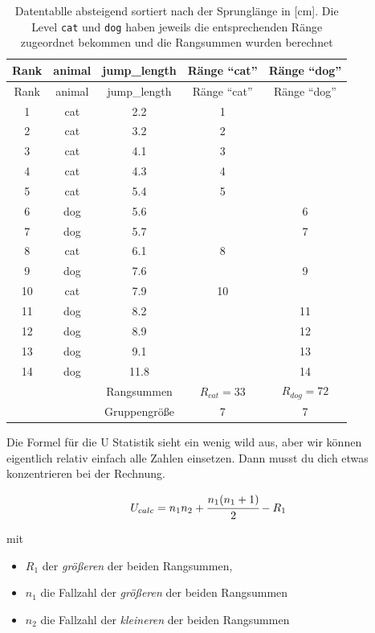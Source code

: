 \documentclass[
  letterpaper,
  DIV=11,
  oneside]{scrreport}
\providecommand{\tightlist}{%
  \setlength{\itemsep}{0pt}\setlength{\parskip}{0pt}}\usepackage{longtable,booktabs,array}
\begin{document}
\hypertarget{tbl-utest-rank}{}
\begin{longtable}[]{@{}ccccc@{}}
\caption{\label{tbl-utest-rank}Datentablle absteigend sortiert nach der
Sprunglänge in {[}cm{]}. Die Level \texttt{cat} und \texttt{dog} haben
jeweils die entsprechenden Ränge zugeordnet bekommen und die Rangsummen
wurden berechnet}\tabularnewline
\toprule()
Rank & animal & jump\_length & Ränge ``cat'' & Ränge ``dog'' \\
\midrule()
\endfirsthead
\toprule()
Rank & animal & jump\_length & Ränge ``cat'' & Ränge ``dog'' \\
\midrule()
\endhead
1 & cat & 2.2 & 1 & \\
2 & cat & 3.2 & 2 & \\
3 & cat & 4.1 & 3 & \\
4 & cat & 4.3 & 4 & \\
5 & cat & 5.4 & 5 & \\
6 & dog & 5.6 & & 6 \\
7 & dog & 5.7 & & 7 \\
8 & cat & 6.1 & 8 & \\
9 & dog & 7.6 & & 9 \\
10 & cat & 7.9 & 10 & \\
11 & dog & 8.2 & & 11 \\
12 & dog & 8.9 & & 12 \\
13 & dog & 9.1 & & 13 \\
14 & dog & 11.8 & & 14 \\
& & Rangsummen & \(R_{cat} = 33\) & \(R_{dog} = 72\) \\
& & Gruppengröße & 7 & 7 \\
\bottomrule()
\end{longtable}

Die Formel für die U Statistik sieht ein wenig wild aus, aber wir können
eigentlich relativ einfach alle Zahlen einsetzen. Dann musst du dich
etwas konzentrieren bei der Rechnung.

\[
U_{calc} = n_1n_2 + \cfrac{n_1(n_1+1)}{2}-R_1
\]

mit

\begin{itemize}
\tightlist
\item
  \(R_1\) der \emph{größeren} der beiden Rangsummen,
\item
  \(n_1\) die Fallzahl der \emph{größeren} der beiden Rangsummen
\item
  \(n_2\) die Fallzahl der \emph{kleineren} der beiden Rangsummen
\end{itemize}
\end{document}
